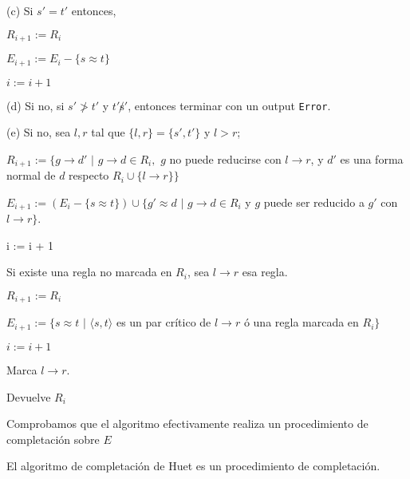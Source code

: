 \hspace{0.5cm} (c) Si $s' = t'$ entonces,

\hspace{1.4cm} $R_{i+1} := R_i$

\hspace{1.4cm} $E_{i+1} := E_i - \{s \approx t\}$

\hspace{1.4cm} $i := i+1$

\hspace{0.5cm} (d) Si no, si $s' \not > t'$ y $t' \not s'$, entonces
terminar con un output \texttt{Error}.

\hspace{0.5cm} (e) Si no, sea $l,r$ tal que $\{l,r \} = \{ s',t' \}$ y
$l >r$;

\hspace{1.4cm}
$R_{i+1} := \{g \rightarrow d'$ $|$ $g \rightarrow d \in R_i,$ $g$ no
puede reducirse con $l \rightarrow r$, y $d'$ es una forma normal de
$d$ respecto $R_i \cup \{l \rightarrow r\} \}$

\hspace{1.4cm}
$E_{i+1} := (E_i - \{s \approx t \}) \cup \{g' \approx d$ $|$
$g \rightarrow d \in R_i$ y $g$ puede ser reducido a $g'$ con $l \rightarrow r \}$.

\hspace{1.4cm} i := i + 1

\hspace{0.5cm} Si existe una regla no marcada en $R_i$, sea
$l \rightarrow r$ esa regla.

\hspace{1.4cm} $R_{i+1} := R_i$

\hspace{1.4cm} $E_{i+1} := \{s \approx t$ $|$ $\langle s, t \rangle$
es un par crítico de $l \rightarrow r$ ó una regla marcada en $R_i \}$

\hspace{1.4cm} $i := i+1$

\hspace{1.4cm} Marca $l \rightarrow r$.

Devuelve $R_i$

\hrulefill

Comprobamos que el algoritmo efectivamente realiza un procedimiento de
completación sobre $E$

\begin{lema}
El algoritmo de completación de Huet es un procedimiento de completación.
\end{lema}

